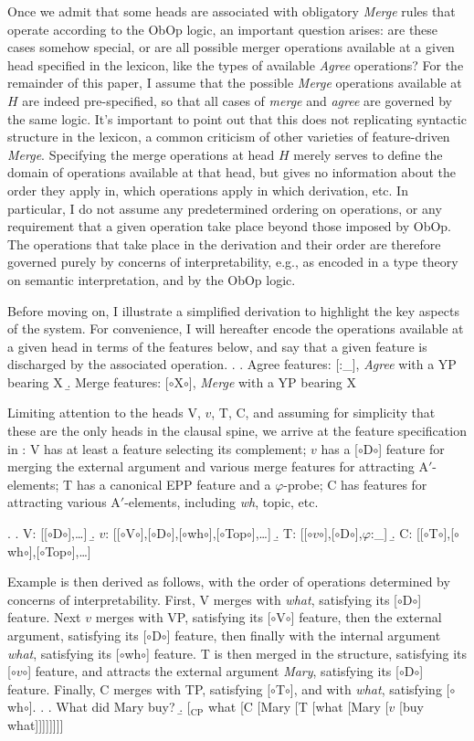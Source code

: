 \documentclass[11pt, letterpaper]{paper_nick}
\newcommand{\fm}[1]{[$\circ$#1$\circ$]}
\begin{document}
Once we admit that some heads are associated with obligatory \emph{Merge} rules that operate according to the ObOp logic, an important question arises: are these cases somehow special, or are all possible merger operations available at a given head specified in the lexicon, like the types of available \emph{Agree} operations? For the remainder of this paper, I assume that the possible \emph{Merge} operations available at $H$ are indeed pre-specified, so that all cases of \emph{merge} and \emph{agree} are governed by the same logic. It's important to point out that this does not replicating syntactic structure in the lexicon, a common criticism of other varieties of feature-driven \emph{Merge}. Specifying the merge operations at head $H$ merely serves to define the domain of operations available at that head, but gives no information about the order they apply in, which operations apply in which derivation, etc. In particular, I do not assume any predetermined ordering on operations, or any requirement that a given operation take place beyond those imposed by ObOp. The operations that take place in the derivation and their order are therefore governed purely by concerns of interpretability, e.g., as encoded in a type theory on semantic interpretation, and by the ObOp logic. 

Before moving on, I illustrate a simplified derivation to highlight the key aspects of the system. For convenience, I will hereafter encode the operations available at a given head in terms of the features below, and say that a given feature is discharged by the associated operation. 
\ex. \a. Agree features: [:\_], \emph{Agree} with a YP bearing X
\b. Merge features: \fm{X}, \emph{Merge} with a YP bearing X

Limiting attention to the heads V, $v$, T, C, and assuming for simplicity that these are the only heads in the clausal spine, we arrive at the feature specification in \Next: V has at least a feature selecting its complement; $v$ has a \fm{D} feature for merging the external argument and various merge features for attracting A$'$-elements; T has a canonical EPP feature and a $\varphi$-probe; C has features for attracting various A$'$-elements, including \emph{wh}, topic, etc.
\begin{multicols}{2} 
\ex. \a. V: [\fm{D},\ldots]
\b. $v$: [\fm{V},\fm{D},\fm{wh},\fm{Top},\ldots]
\b. T: [\fm{$v$},\fm{D},$\varphi$:\_]
\b. C: [\fm{T},\fm{wh},\fm{Top},\ldots]

\end{multicols}
\noindent Example \Next is then derived as follows, with the order of operations determined by concerns of interpretability. First, V merges with \emph{what}, satisfying its \fm{D} feature. Next $v$ merges with VP, satisfying its \fm{V} feature, then the external argument, satisfying its \fm{D} feature, then finally with the internal argument \emph{what}, satisfying its \fm{wh} feature. T is then merged in the structure, satisfying its \fm{$v$} feature, and attracts the external argument \emph{Mary}, satisfying its \fm{D} feature. Finally, C merges with TP, satisfying \fm{T}, and with \emph{what}, satisfying \fm{wh}.  
\ex. \a. What did Mary buy?
\b. [$_\text{CP}$ what [C [Mary [T [what [Mary [$v$ [buy what]]]]]]]]
\end{document}
